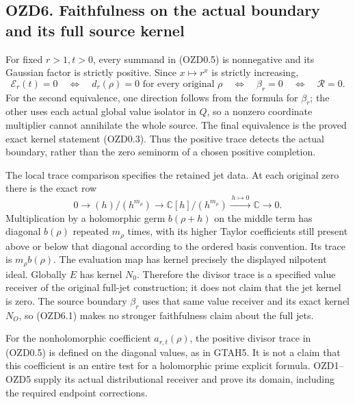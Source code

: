 \subsection{OZD6. Faithfulness on the actual boundary and its full
source
kernel}\label{ozd6.-faithfulness-on-the-actual-boundary-and-its-full-source-kernel}

For fixed \(r>1,t>0\), every summand in (OZD0.5) is nonnegative and its
Gaussian factor is strictly positive. Since \(x\mapsto r^x\) is strictly
increasing, \[
\mathcal E_r(t)=0
\quad\Longleftrightarrow\quad
d_r(\rho)=0\text{ for every original }\rho
\quad\Longleftrightarrow\quad\beta_r=0
\quad\Longleftrightarrow\quad\mathcal R=0.
\tag{OZD6.1}
\] For the second equivalence, one direction follows from the formula
for \(\beta_r\); the other uses each actual global value isolator in
\(Q\), so a nonzero coordinate multiplier cannot annihilate the whole
source. The final equivalence is the proved exact kernel statement
(OZD0.3). Thus the positive trace detects the actual boundary, rather
than the zero seminorm of a chosen positive completion.

The local trace comparison specifies the retained jet data. At each
original zero there is the exact row \[
0\longrightarrow(h)/(h^{m_\rho})\longrightarrow
\mathbb C[h]/(h^{m_\rho})\xrightarrow{\ h\mapsto0\ }\mathbb C\longrightarrow0.
\tag{OZD6.2}
\] Multiplication by a holomorphic germ \(b(\rho+h)\) on the middle term
has diagonal \(b(\rho)\) repeated \(m_\rho\) times, with its higher
Taylor coefficients still present above or below that diagonal according
to the ordered basis convention. Its trace is \(m_\rho b(\rho)\). The
evaluation map has kernel precisely the displayed nilpotent ideal.
Globally \(E\) has kernel \(N_0\). Therefore the divisor trace is a
specified value receiver of the original full-jet construction; it does
not claim that the jet kernel is zero. The source boundary \(\beta_r\)
uses that same value receiver and its exact kernel \(N_O\), so (OZD6.1)
makes no stronger faithfulness claim about the full jets.

For the nonholomorphic coefficient \(a_{r,t}(\rho)\), the positive
divisor trace in (OZD0.5) is defined on the diagonal values, as in
GTAH5. It is not a claim that this coefficient is an entire test for a
holomorphic prime explicit formula. OZD1--OZD5 supply its actual
distributional receiver and prove its domain, including the required
endpoint corrections.

